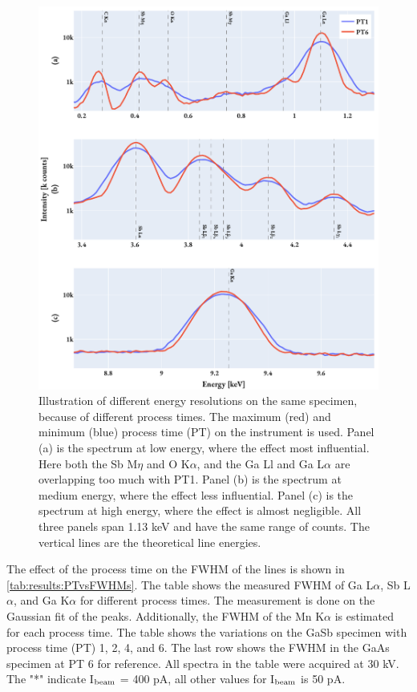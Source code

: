 \begin{figure}[hptb]
    \centering
    \includegraphics[width=0.95\linewidth]{figures/results/eds_energyResolutions_process_time.pdf}
    \caption{
        Illustration of different energy resolutions on the same specimen, because of different process times.
        The maximum (red) and minimum (blue) process time (PT) on the instrument is used.
        Panel (a) is the spectrum at low energy, where the effect most influential.
        Here both the Sb M$\eta$ and O K$\alpha$, and the Ga Ll and Ga L$\alpha$ are overlapping too much with PT1.
        Panel (b) is the spectrum at medium energy, where the effect less influential.
        Panel (c) is the spectrum at high energy, where the effect is almost negligible.
        All three panels span 1.13 keV and have the same range of counts.
        The vertical lines are the theoretical line energies.
    }
    \label{fig:results:energy_resolutions_process_time}
\end{figure}


The effect of the process time on the FWHM of the lines is shown in \cref{tab:results:PTvsFWHMs}.
The table shows the measured FWHM of Ga L$\alpha$, Sb L$\alpha$, and Ga K$\alpha$ for different process times.
The measurement is done on the Gaussian fit of the peaks.
Additionally, the FWHM of the Mn K$\alpha$ is estimated for each process time.
The table shows the variations on the GaSb specimen with process time (PT) 1, 2, 4, and 6.
The last row shows the FWHM in the GaAs specimen at PT 6 for reference.
All spectra in the table were acquired at 30 kV.
The "*" indicate I$_\textnormal{beam}$ = 400 pA, all other values for I$_\textnormal{beam}$ is 50 pA.


